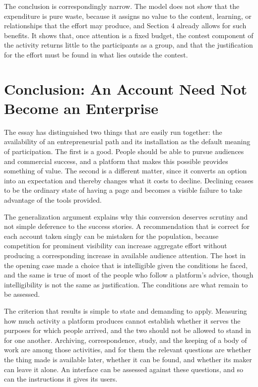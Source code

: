 \documentclass[12pt]{article}
\theoremstyle{plain}
\theoremstyle{definition}
\begin{document}
The conclusion is correspondingly narrow. The model does not show that the expenditure is pure waste, because it assigns no value to the content, learning, or relationships that the effort may produce, and Section 4 already allows for such benefits. It shows that, once attention is a fixed budget, the contest component of the activity returns little to the participants as a group, and that the justification for the effort must be found in what lies outside the contest.

\section{Conclusion: An Account Need Not Become an Enterprise}

The essay has distinguished two things that are easily run together: the availability of an entrepreneurial path and its installation as the default meaning of participation. The first is a good. People should be able to pursue audiences and commercial success, and a platform that makes this possible provides something of value. The second is a different matter, since it converts an option into an expectation and thereby changes what it costs to decline. Declining ceases to be the ordinary state of having a page and becomes a visible failure to take advantage of the tools provided.

The generalization argument explains why this conversion deserves scrutiny and not simple deference to the success stories. A recommendation that is correct for each account taken singly can be mistaken for the population, because competition for prominent visibility can increase aggregate effort without producing a corresponding increase in available audience attention. The host in the opening case made a choice that is intelligible given the conditions he faced, and the same is true of most of the people who follow a platform's advice, though intelligibility is not the same as justification. The conditions are what remain to be assessed.

The criterion that results is simple to state and demanding to apply. Measuring how much activity a platform produces cannot establish whether it serves the purposes for which people arrived, and the two should not be allowed to stand in for one another. Archiving, correspondence, study, and the keeping of a body of work are among those activities, and for them the relevant questions are whether the thing made is available later, whether it can be found, and whether its maker can leave it alone. An interface can be assessed against these questions, and so can the instructions it gives its users.
\end{document}
